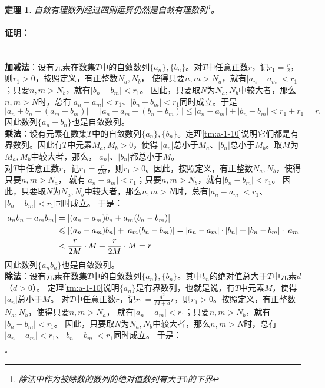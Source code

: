 \documentclass[12pt,UTF8]{ctexbook}
\newtheorem{tm}{定理}[section]
\newenvironment{proof2}{\paragraph{\textbf{证明：}}}{\hfill$\square$}
\begin{document}
\begin{appendix}
\begin{tm}\label{tm:a-1-3}
    自敛有理数列经过四则运算仍然是自敛有理数列\footnote{除法中作为被除数的数列的绝对值数列有大于$0$的下界}。
\end{tm}
\begin{proof2}
    \mbox{} \\
    \textbf{加减法}：设有元素在数集$T$中的自敛数列$\{a_n\}, \{b_n\}$。对$T$中任意正数$r$，记$r_1=\frac{r}{2}$，则$r_1>0$，按照定义，有正整数$N_a, N_b$，
    使得只要$n,m>N_a$，就有$|a_n - a_m| < r_1$；只要$n,m>N_b$，就有$|b_n - b_m| < r_1$。
    因此，只要取$N$为$N_a, N_b$中较大者，那么$n,m>N$时，总有$|a_n - a_m| < r_1$、$|b_n - b_m| < r_1$同时成立。于是
    $$ |a_n \pm b_n - (a_m \pm b_m)| = |a_n - a_m \pm (b_n - b_m)| \leqslant |a_n - a_m| + |b_n - b_m| < r_1 + r_1 = r. $$
    因此数列$\{a_n \pm b_n\}$也是自敛数列。\\
    \textbf{乘法}：设有元素在数集$T$中的自敛数列$\{a_n\}, \{b_n\}$。定理\ref{tm:a-1-10}说明它们都是有界数列。因此有$T$中元素$M_a, M_b>0$，使得
    $|a_n|$总小于$M_a$、$|b_n|$总小于$M_b$。取$M$为$M_a, M_b$中较大者，那么，$|a_n|$、$|b_n|$都总小于$M$。\\    
    对$T$中任意正数$r$，记$r_1 = \frac{r}{2M}$，则$r_1>0$。因此，按照定义，有正整数$N_a, N_b$，使得只要$n,m>N_a$，
    就有$|a_n - a_m| < r_1$；只要$n,m>N_b$，就有$|b_n - b_m| < r_1$。
    因此，只要取$N$为$N_a, N_b$中较大者，那么$n,m>N$时，总有$|a_n - a_m| < r_1$、$|b_n - b_m| < r_1$同时成立。
    于是：
    \begin{align}
        |a_nb_n - a_mb_m| &= |(a_n - a_m)b_n + a_m(b_n - b_m)| \notag \\
        &\leqslant |(a_n - a_m)b_n| + |a_m(b_n - b_m)| = |a_n - a_m|\cdot |b_n| + |b_n - b_m|\cdot|a_m| \notag \\
        &< \frac{r}{2M} \cdot M + \frac{r}{2M} \cdot M = r \notag
    \end{align}
    因此数列$\{a_n b_n\}$也是自敛数列。\\
    \textbf{除法}：设有元素在数集$T$中的自敛数列$\{a_n\}, \{b_n\}$。其中$b_n$的绝对值总大于$T$中元素$d$（$d > 0$）。
    定理\ref{tm:a-1-10}说明$\{a_n\}$是有界数列，也就是说，有$T$中元素$M$，使得$|a_n|$总小于$M$。
    对$T$中任意正数$r$，记$r_1 = \frac{d^2}{M+d}r$，则$r_1>0$。按照定义，有正整数$N_a, N_b$，使得只要$n,m>N_a$，
    就有$|a_n - a_m| < r_1$；只要$n,m>N_b$，就有$|b_n - b_m| < r_1$。
    因此，只要取$N$为$N_a, N_b$中较大者，那么$n,m>N$时，总有$|a_n - a_m| < r_1$、$|b_n - b_m| < r_1$同时成立。
    于是：
    \begin{align}

\end{align}
\end{proof2}
\end{appendix}
\end{document}
